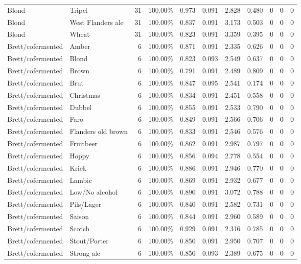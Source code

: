{\begin{longtable}{llrrrrrrrrr}
Blond & Tripel & 31 & 100.00\% & 0.973 & 0.091 & 2.828 & 0.480 & 0 & 0 & 0 \\
Blond & West Flanders ale & 31 & 100.00\% & 0.837 & 0.091 & 3.173 & 0.503 & 0 & 0 & 0 \\
Blond & Wheat & 31 & 100.00\% & 0.823 & 0.091 & 3.359 & 0.395 & 0 & 0 & 0 \\
Brett/cofermented & Amber & 6 & 100.00\% & 0.871 & 0.091 & 2.335 & 0.626 & 0 & 0 & 0 \\
Brett/cofermented & Blond & 6 & 100.00\% & 0.823 & 0.093 & 2.549 & 0.637 & 0 & 0 & 0 \\
Brett/cofermented & Brown & 6 & 100.00\% & 0.791 & 0.091 & 2.489 & 0.809 & 0 & 0 & 0 \\
Brett/cofermented & Brut & 6 & 100.00\% & 0.847 & 0.095 & 2.541 & 0.174 & 0 & 0 & 0 \\
Brett/cofermented & Christmas & 6 & 100.00\% & 0.834 & 0.091 & 2.451 & 0.558 & 0 & 0 & 0 \\
Brett/cofermented & Dubbel & 6 & 100.00\% & 0.855 & 0.091 & 2.533 & 0.790 & 0 & 0 & 0 \\
Brett/cofermented & Faro & 6 & 100.00\% & 0.849 & 0.091 & 2.566 & 0.706 & 0 & 0 & 0 \\
Brett/cofermented & Flanders old brown & 6 & 100.00\% & 0.833 & 0.091 & 2.546 & 0.576 & 0 & 0 & 0 \\
Brett/cofermented & Fruitbeer & 6 & 100.00\% & 0.862 & 0.091 & 2.987 & 0.797 & 0 & 0 & 0 \\
Brett/cofermented & Hoppy & 6 & 100.00\% & 0.856 & 0.094 & 2.778 & 0.554 & 0 & 0 & 0 \\
Brett/cofermented & Kriek & 6 & 100.00\% & 0.886 & 0.091 & 2.946 & 0.770 & 0 & 0 & 0 \\
Brett/cofermented & Lambic & 6 & 100.00\% & 0.869 & 0.091 & 2.932 & 0.677 & 0 & 0 & 0 \\
Brett/cofermented & Low/No alcohol & 6 & 100.00\% & 0.890 & 0.091 & 3.072 & 0.788 & 0 & 0 & 0 \\
Brett/cofermented & Pils/Lager & 6 & 100.00\% & 0.840 & 0.091 & 2.582 & 0.731 & 0 & 0 & 0 \\
Brett/cofermented & Saison & 6 & 100.00\% & 0.844 & 0.091 & 2.960 & 0.589 & 0 & 0 & 0 \\
Brett/cofermented & Scotch & 6 & 100.00\% & 0.929 & 0.091 & 2.316 & 0.785 & 0 & 0 & 0 \\
Brett/cofermented & Stout/Porter & 6 & 100.00\% & 0.850 & 0.091 & 2.950 & 0.707 & 0 & 0 & 0 \\
Brett/cofermented & Strong ale & 6 & 100.00\% & 0.850 & 0.093 & 2.389 & 0.675 & 0 & 0 & 0 \\

\end{longtable}}
